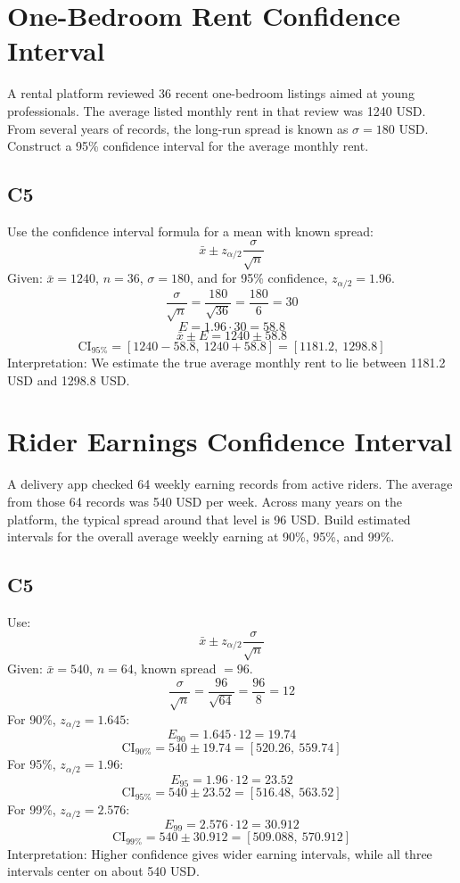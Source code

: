 	\begin{ExamProblems}
		\item
		\section{One-Bedroom Rent Confidence Interval}
		A rental platform reviewed 36 recent one-bedroom listings aimed at young professionals.
		The average listed monthly rent in that review was 1240 USD.
		From several years of records, the long-run spread is known as $\sigma=180$ USD.
		Construct a 95\% confidence interval for the average monthly rent.

		\subsection*{C5}
		Use the confidence interval formula for a mean with known spread:
		\[
		\bar{x} \pm z_{\alpha/2}\frac{\sigma}{\sqrt{n}}
		\]
		Given: $\bar{x}=1240$, $n=36$, $\sigma=180$, and for 95\% confidence, $z_{\alpha/2}=1.96$.
		\[
		\frac{\sigma}{\sqrt{n}}=\frac{180}{\sqrt{36}}=\frac{180}{6}=30
		\]
		\[
		E=1.96\cdot 30=58.8
		\]
		\[
		\bar{x}\pm E=1240\pm 58.8
		\]
		\[
		\text{CI}_{95\%}=[1240-58.8,\ 1240+58.8]=[1181.2,\ 1298.8]
		\]
		Interpretation: We estimate the true average monthly rent to lie between 1181.2 USD and 1298.8 USD.

		\newpage
		\item
		\section{Rider Earnings Confidence Interval}
		A delivery app checked 64 weekly earning records from active riders.
		The average from those 64 records was 540 USD per week.
		Across many years on the platform, the typical spread around that level is 96 USD.
		Build estimated intervals for the overall average weekly earning at 90\%, 95\%, and 99\%.

		\subsection*{C5}
		Use:
		\[
		\bar{x} \pm z_{\alpha/2}\frac{\sigma}{\sqrt{n}}
		\]
		Given: $\bar{x}=540$, $n=64$, known spread $=96$.
		\[
		\frac{\sigma}{\sqrt{n}}=\frac{96}{\sqrt{64}}=\frac{96}{8}=12
		\]
		For 90\%, $z_{\alpha/2}=1.645$:
		\[
		E_{90}=1.645\cdot 12=19.74
		\]
		\[
		\text{CI}_{90\%}=540\pm 19.74=[520.26,\ 559.74]
		\]
		For 95\%, $z_{\alpha/2}=1.96$:
		\[
		E_{95}=1.96\cdot 12=23.52
		\]
		\[
		\text{CI}_{95\%}=540\pm 23.52=[516.48,\ 563.52]
		\]
		For 99\%, $z_{\alpha/2}=2.576$:
		\[
		E_{99}=2.576\cdot 12=30.912
		\]
		\[
		\text{CI}_{99\%}=540\pm 30.912=[509.088,\ 570.912]
		\]
		Interpretation: Higher confidence gives wider earning intervals, while all three intervals center on about 540 USD.


\end{ExamProblems}
